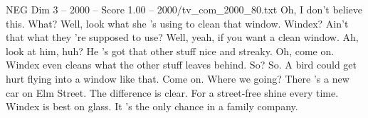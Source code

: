 \begin{textsample}{NEG Dim 3 – 2000 – Score 1.00 – 2000/tv\_com\_2000\_80.txt}  \label{ex:f3_neg_011}
Oh, I don't believe this.
What?
Well, look what she 's using to clean that window.
Windex?
Ain't that what they 're supposed to use?
Well, yeah, if you want a clean window.
Ah, look at him, huh?
He 's got that other stuff nice and streaky.
Oh, come on.
Windex even cleans what the other stuff leaves behind.
So?
So.
A bird could get hurt flying into a window like that.
Come on.
Where we going?
There 's a new car on Elm Street.
The difference is clear.
For a street-free shine every time.
Windex is best on glass.
It 's the only chance in a family company.

\end{textsample}
